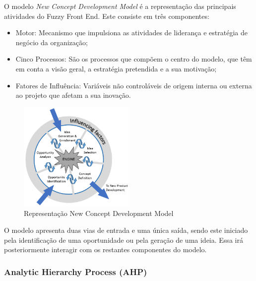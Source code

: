 O modelo \emph{New Concept Development Model} é a representação das principais atividades do Fuzzy Front End. Este consiste em três componentes:

\begin{itemize}

\item Motor: Mecanismo que impulsiona as atividades de liderança e estratégia de negócio da organização;

\item Cinco Processos: São os processos que compõem o centro do modelo, que têm em conta a visão geral, a estratégia pretendida e a sua motivação;

\item Fatores de Influência: Variáveis não controláveis de origem interna ou externa ao projeto que afetam a sua inovação.

\end{itemize}

\begin{figure}[H]
    \begin{center}
    \includegraphics[width=0.5\textwidth]{figures/The-New-Concept-Development-NCD-model-Koen-et-al-2001.png}
    \caption{Representação New Concept Development Model}
    \end{center}
\end{figure}

O modelo apresenta duas vias de entrada e uma única saída, sendo este iniciado pela identificação de uma oportunidade ou pela geração de uma ideia. Essa irá posteriormente interagir com os restantes componentes do modelo.

\subsubsection{Analytic Hierarchy Process (AHP) \label{sym:AHP_section}}

